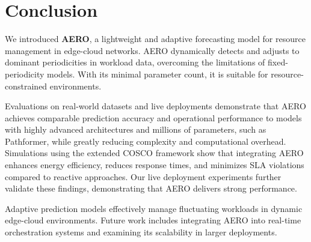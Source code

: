 \section{Conclusion}
\label{sec:ch3_conclusion}

We introduced \textbf{AERO}, a lightweight and adaptive forecasting model for resource management in edge-cloud networks. AERO dynamically detects and adjusts to dominant periodicities in workload data, overcoming the limitations of fixed-periodicity models. With its minimal parameter count, it is suitable for resource-constrained environments.

Evaluations on real-world datasets and live deployments demonstrate that \ac{AERO} achieves comparable prediction accuracy and operational performance to models with highly advanced architectures and millions of parameters, such as Pathformer, while greatly reducing complexity and computational overhead. Simulations using the extended \ac{COSCO} framework show that integrating \ac{AERO} enhances energy efficiency, reduces response times, and minimizes \ac{SLA} violations compared to reactive approaches. Our live deployment experiments further validate these findings, demonstrating that \ac{AERO} delivers strong performance.

Adaptive prediction models effectively manage fluctuating workloads in dynamic edge-cloud environments. Future work includes integrating \ac{AERO} into real-time orchestration systems and examining its scalability in larger deployments.
